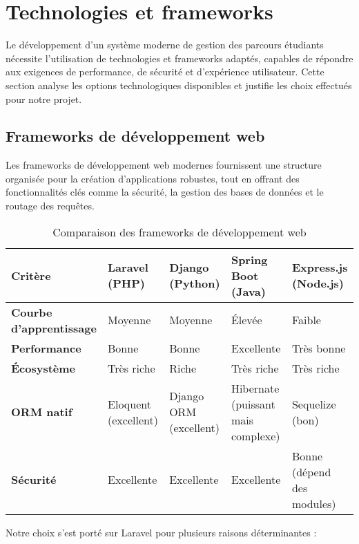 \documentclass[french,12pt]{report} %
\begin{document}
\section{Technologies et frameworks}

Le développement d'un système moderne de gestion des parcours étudiants nécessite l'utilisation de technologies et frameworks adaptés, capables de répondre aux exigences de performance, de sécurité et d'expérience utilisateur. Cette section analyse les options technologiques disponibles et justifie les choix effectués pour notre projet.

\subsection{Frameworks de développement web}

Les frameworks de développement web modernes fournissent une structure organisée pour la création d'applications robustes, tout en offrant des fonctionnalités clés comme la sécurité, la gestion des bases de données et le routage des requêtes.

\begin{table}[H]
\centering
\begin{tabular}{|p{2cm}|p{2.5cm}|p{2.5cm}|p{2.5cm}|p{2.5cm}|}
\hline
\textbf{Critère} & \textbf{Laravel (PHP)} & \textbf{Django (Python)} & \textbf{Spring Boot (Java)} & \textbf{Express.js (Node.js)} \\ \hline
\textbf{Courbe d'apprentissage} & Moyenne & Moyenne & Élevée & Faible \\ \hline
\textbf{Performance} & Bonne & Bonne & Excellente & Très bonne \\ \hline
\textbf{Écosystème} & Très riche & Riche & Très riche & Très riche \\ \hline
\textbf{ORM natif} & Eloquent (excellent) & Django ORM (excellent) & Hibernate (puissant mais complexe) & Sequelize (bon) \\ \hline
\textbf{Sécurité} & Excellente & Excellente & Excellente & Bonne (dépend des modules) \\ \hline
\end{tabular}
\caption{Comparaison des frameworks de développement web}
\label{tab:comparaison-frameworks}
\end{table}

Notre choix s'est porté sur Laravel pour plusieurs raisons déterminantes :
\end{document}
